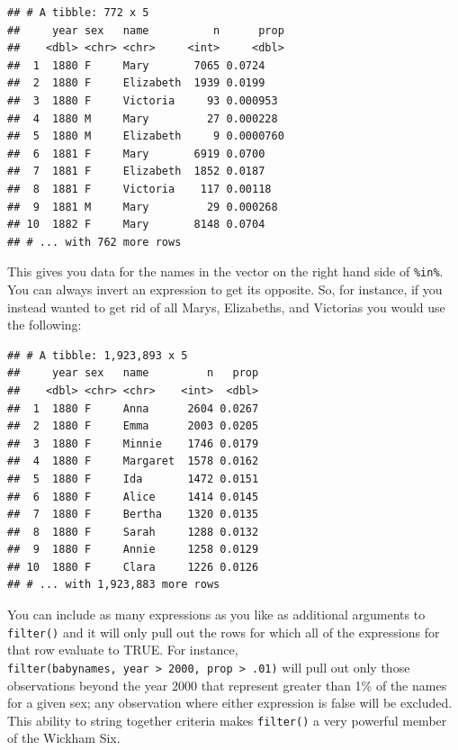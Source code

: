 \documentclass[]{book}
\newenvironment{Shaded}{\begin{snugshade}}{\end{snugshade}}
\newcommand{\KeywordTok}[1]{\textcolor[rgb]{0.13,0.29,0.53}{\textbf{#1}}}
\newcommand{\NormalTok}[1]{#1}
\newcommand{\OperatorTok}[1]{\textcolor[rgb]{0.81,0.36,0.00}{\textbf{#1}}}
\newcommand{\StringTok}[1]{\textcolor[rgb]{0.31,0.60,0.02}{#1}}
\begin{document}
\begin{verbatim}
## # A tibble: 772 x 5
##     year sex   name          n      prop
##    <dbl> <chr> <chr>     <int>     <dbl>
##  1  1880 F     Mary       7065 0.0724   
##  2  1880 F     Elizabeth  1939 0.0199   
##  3  1880 F     Victoria     93 0.000953 
##  4  1880 M     Mary         27 0.000228 
##  5  1880 M     Elizabeth     9 0.0000760
##  6  1881 F     Mary       6919 0.0700   
##  7  1881 F     Elizabeth  1852 0.0187   
##  8  1881 F     Victoria    117 0.00118  
##  9  1881 M     Mary         29 0.000268 
## 10  1882 F     Mary       8148 0.0704   
## # ... with 762 more rows
\end{verbatim}

This gives you data for the names in the vector on the right hand side of \texttt{\%in\%}. You can always invert an expression to get its opposite. So, for instance, if you instead wanted to get rid of all Marys, Elizabeths, and Victorias you would use the following:

\begin{Shaded}
\end{Shaded}

\begin{verbatim}
## # A tibble: 1,923,893 x 5
##     year sex   name         n   prop
##    <dbl> <chr> <chr>    <int>  <dbl>
##  1  1880 F     Anna      2604 0.0267
##  2  1880 F     Emma      2003 0.0205
##  3  1880 F     Minnie    1746 0.0179
##  4  1880 F     Margaret  1578 0.0162
##  5  1880 F     Ida       1472 0.0151
##  6  1880 F     Alice     1414 0.0145
##  7  1880 F     Bertha    1320 0.0135
##  8  1880 F     Sarah     1288 0.0132
##  9  1880 F     Annie     1258 0.0129
## 10  1880 F     Clara     1226 0.0126
## # ... with 1,923,883 more rows
\end{verbatim}

You can include as many expressions as you like as additional arguments to \texttt{filter()} and it will only pull out the rows for which all of the expressions for that row evaluate to TRUE. For instance, \texttt{filter(babynames,\ year\ \textgreater{}\ 2000,\ prop\ \textgreater{}\ .01)} will pull out only those observations beyond the year 2000 that represent greater than 1\% of the names for a given sex; any observation where either expression is false will be excluded. This ability to string together criteria makes \texttt{filter()} a very powerful member of the Wickham Six.
\end{document}
